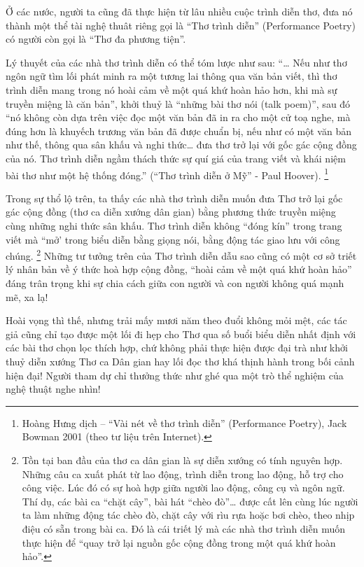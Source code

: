 \documentclass[../main.tex]{subfiles}
\begin{document}
\begin{multicols}{2}
Ở các nước, người ta cũng đã thực hiện từ lâu nhiều cuộc trình diễn thơ, đưa nó thành một thể tài nghệ thuât riêng gọi là “Thơ trình diễn” (Performance Poetry) có người còn gọi là “Thơ đa phương tiện”. 
 
Lý thuyết của các nhà thơ trình diễn có thể tóm lược như sau: “… Nếu như thơ ngôn ngữ tìm lối phát minh ra một tương lai thông qua văn bản viết, thì thơ trình diễn mang trong nó hoài cảm về một quá khứ hoàn hảo hơn, khi mà sự truyền miệng là căn bản”, khởi thuỷ là “những bài thơ nói (talk poem)”, sau đó “nó không còn dựa trên việc đọc một văn bản đã in ra cho một cử toạ nghe, mà đúng hơn là khuyếch trương văn bản đã được chuẩn bị, nếu như có một văn bản như thế, thông qua sân khấu và nghi thức… đưa thơ trở lại với gốc gác cộng đồng của nó. Thơ trình diễn ngầm thách thức sự quí giá của trang viết và khái niệm bài thơ như một hệ thống đóng.” (“Thơ trình diễn ở Mỹ” - Paul Hoover). \footnote{
Hoàng Hưng dịch – “Vài nét về thơ trình diễn” (Performance Poetry), Jack Bowman 2001 (theo tư liệu trên Internet).}  
 
Trong sự thổ lộ trên, ta thấy các nhà thơ trình diễn muốn đưa Thơ trở lại gốc gác cộng đồng (thơ ca diễn xướng dân gian) bằng phương thức truyền miệng cùng những nghi thức sân khấu. Thơ trình diễn không “đóng kín” trong trang viết mà “mở’ trong biểu diễn bằng giọng nói, bằng động tác giao lưu với công chúng. \footnote{
Tồn tại ban đầu của thơ ca dân gian là sự diễn xướng có tính nguyên hợp. Những câu ca xuất phát từ lao động, trình diễn trong lao động, hỗ trợ cho công việc. Lúc đó có sự hoà hợp giữa người lao động, công cụ và ngôn ngữ. Thí dụ, các bài ca “chặt cây”, bài hát “chèo đò”… được cất lên cùng lúc người ta làm những động tác chèo đò, chặt cây với rìu rựa hoặc bơi chèo, theo nhịp điệu có sẵn trong bài ca. Đó là cái triết lý mà các nhà thơ trình diễn muốn thực hiện để “quay trở lại nguồn gốc cộng đồng trong một quá khứ hoàn hảo”.}  Những tư tưởng trên của Thơ trình diễn dẫu sao cũng có một cơ sở triết lý nhân bản về ý thức hoà hợp cộng đồng, “hoài cảm về một quá khứ hoàn hảo” đáng trân trọng khi sự chia cách giữa con người và con người không quá mạnh mẽ, xa lạ! 
 
Hoài vọng thì thế, nhưng trải mấy mươi năm theo đuổi không mỏi mệt, các tác giả cũng chỉ tạo được một lối đi hẹp cho Thơ qua số buổi biểu diễn nhất định với các bài thơ chọn lọc thích hợp, chứ không phải thực hiện được đại trà như khởi thuỷ diễn xướng Thơ ca Dân gian hay lối đọc thơ khá thịnh hành trong bối cảnh hiện đại! Người tham dự chỉ thưởng thức như ghé qua một trò thể nghiệm của nghệ thuật nghe nhìn! 
 

\end{multicols}
\end{document}
